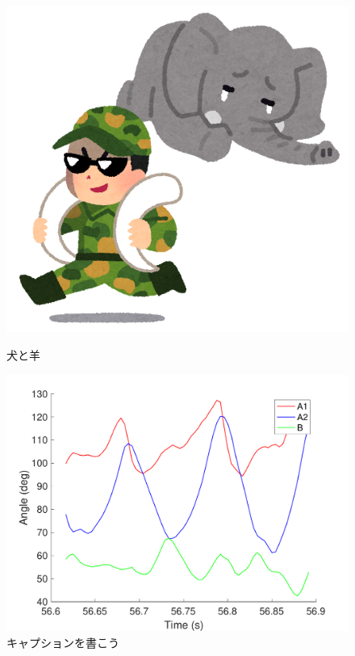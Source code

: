 \begin{figure}[tb]
\begin{minipage}[b]{.5\columnwidth}
  \centering
  \includegraphics[width=\columnwidth]{./figure/elephant.png}
  \label{fig:gorilla}
 \end{minipage}
 \caption{犬と羊}\label{fig:animals}
\end{figure}

\begin{figure}[tb]
    \centering 
     \includegraphics[width=\columnwidth]{./figure/testfig.pdf}
     \caption{キャプションを書こう}
     \label{fig:test}
\end{figure}

